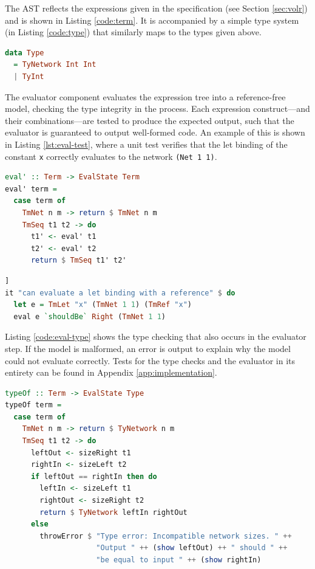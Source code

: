The AST reflects the expressions given in the 
specification (see Section \ref{sec:volr}) and is
shown in Listing \ref{code:term}.
It is accompanied by a simple type system (in Listing \ref{code:type})
that similarly maps to the types given above.

\begin{lstlisting}[language=haskell,label={code:type},caption={Volr type system
in Haskell}]
data Type 
  = TyNetwork Int Int
  | TyInt
\end{lstlisting}

The evaluator component evaluates the expression tree into
a reference-free model, checking the type integrity in the
process.
Each expression construct---and their combinations---are
tested to produce the expected output, such that the evaluator
is guaranteed to output well-formed code.
An example of this is shown in Listing \ref{lst:eval-test},
where a unit test  verifies that the let
binding of the constant \texttt{x} correctly
evaluates to the network \texttt{(Net 1 1)}.

\begin{minipage}{\linewidth}
\begin{lstlisting}[language=haskell,caption={Part of the evaluation code in
Haskell.},label={code:evaluator}]
eval' :: Term -> EvalState Term
eval' term =
  case term of
    TmNet n m -> return $ TmNet n m
    TmSeq t1 t2 -> do
      t1' <- eval' t1 
      t2' <- eval' t2
      return $ TmSeq t1' t2'
\end{lstlisting}
\end{minipage}

\begin{lstlisting}[language=Haskell,label={lst:eval-test},caption={A unit test for the correct evaluation of a let binding.}]]
it "can evaluate a let binding with a reference" $ do
  let e = TmLet "x" (TmNet 1 1) (TmRef "x")
  eval e `shouldBe` Right (TmNet 1 1)
\end{lstlisting} 

Listing \ref{code:eval-type} shows the type checking
that also occurs in the evaluator step. 
If the model is malformed, an error is output to explain why the
model could not evaluate correctly.
Tests for the type checks and the evaluator in its entirety
can be found in Appendix \ref{app:implementation}.

\begin{lstlisting}[language=Haskell,caption={Part of the type checking code in
Haskell.},label={code:eval-type}]
typeOf :: Term -> EvalState Type
typeOf term = 
  case term of
    TmNet n m -> return $ TyNetwork n m
    TmSeq t1 t2 -> do
      leftOut <- sizeRight t1
      rightIn <- sizeLeft t2
      if leftOut == rightIn then do
        leftIn <- sizeLeft t1
        rightOut <- sizeRight t2
        return $ TyNetwork leftIn rightOut
      else
        throwError $ "Type error: Incompatible network sizes. " ++
                     "Output " ++ (show leftOut) ++ " should " ++
                     "be equal to input " ++ (show rightIn)
\end{lstlisting}

